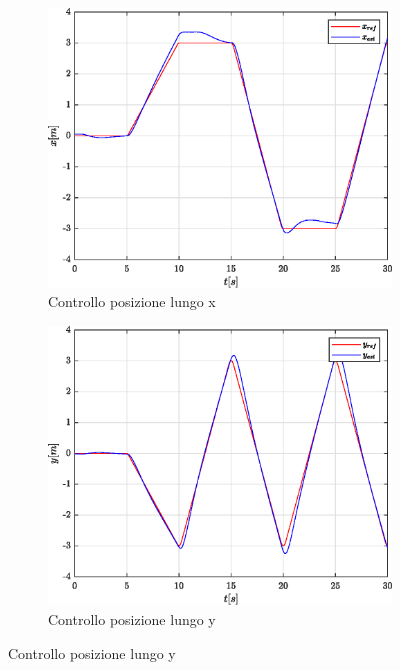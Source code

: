 \begin{figure}
	\centering
	\begin{subfigure}{0.45\textwidth}
		\centering
		\includegraphics[width=1\textwidth]{Simulazioni/Figure/PID/BUTTERFLY/PositionControlXPos}
		\caption{Controllo posizione lungo x}
		\label{fig:BUTTERFLYerrposxPID}
	\end{subfigure}
	\hfill
	\begin{subfigure}{0.45\textwidth}
		\centering
		\includegraphics[width=1\textwidth]{Simulazioni/Figure/PID/BUTTERFLY/PositionControlYPos}
		\caption{Controllo posizione lungo y}

\end{subfigure}
\end{figure}

